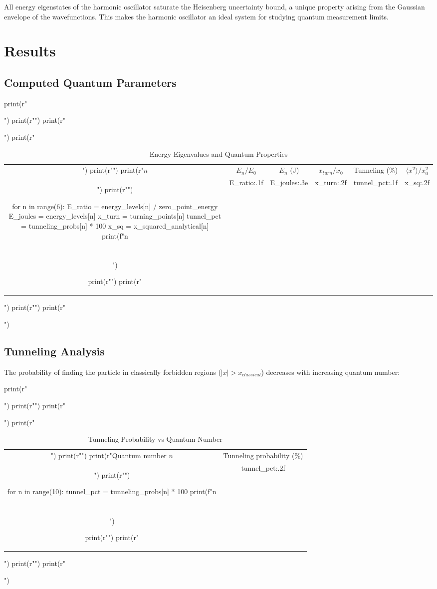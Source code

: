\documentclass[a4paper, 11pt]{article}
\begin{document}
All energy eigenstates of the harmonic oscillator saturate the Heisenberg uncertainty bound,
a unique property arising from the Gaussian envelope of the wavefunctions. This makes the
harmonic oscillator an ideal system for studying quantum measurement limits.

\section{Results}

\subsection{Computed Quantum Parameters}

\begin{pycode}
print(r"\begin{table}[htbp]")
print(r"\centering")
print(r"\caption{Energy Eigenvalues and Quantum Properties}")
print(r"\begin{tabular}{cccccc}")
print(r"\toprule")
print(r"$n$ & $E_n/E_0$ & $E_n$ (J) & $x_{turn}/x_0$ & Tunneling (\%) & $\langle x^2\rangle/x_0^2$ \\")
print(r"\midrule")

for n in range(6):
    E_ratio = energy_levels[n] / zero_point_energy
    E_joules = energy_levels[n]
    x_turn = turning_points[n]
    tunnel_pct = tunneling_probs[n] * 100
    x_sq = x_squared_analytical[n]
    print(f"{n} & {E_ratio:.1f} & {E_joules:.3e} & {x_turn:.2f} & {tunnel_pct:.1f} & {x_sq:.2f} \\\\")

print(r"\bottomrule")
print(r"\end{tabular}")
print(r"\label{tab:energies}")
print(r"\end{table}")
\end{pycode}

\subsection{Tunneling Analysis}

The probability of finding the particle in classically forbidden regions ($|x| > x_{classical}$)
decreases with increasing quantum number:

\begin{pycode}
print(r"\begin{table}[htbp]")
print(r"\centering")
print(r"\caption{Tunneling Probability vs Quantum Number}")
print(r"\begin{tabular}{cc}")
print(r"\toprule")
print(r"Quantum number $n$ & Tunneling probability (\%) \\")
print(r"\midrule")

for n in range(10):
    tunnel_pct = tunneling_probs[n] * 100
    print(f"{n} & {tunnel_pct:.2f} \\\\")

print(r"\bottomrule")
print(r"\end{tabular}")
print(r"\label{tab:tunneling}")
print(r"\end{table}")
\end{pycode}
\end{document}
